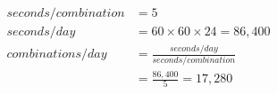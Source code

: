 \documentclass[preview, border=2mm]{standalone}
\begin{document}
\vspace*{\fill}

{\fontsize{32pt}{40pt}\selectfont
    \begin{align*}
        seconds/combination &= 5 \\
        seconds/day &= 60 \times 60 \times 24 = 86{,}400 \\
        combinations/day &= \frac{seconds/day}{seconds/combination} \\
        &= \frac{86{,}400}{5} = 17{,}280
    \end{align*}
}

\vspace*{\fill}
\end{document}
